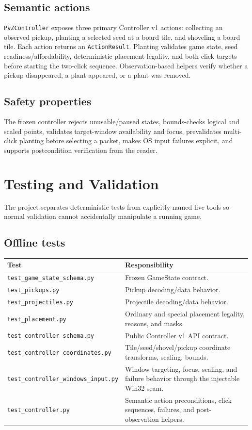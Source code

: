 \documentclass[11pt,a4paper]{article}
\begin{document}
\subsection{Semantic actions}
\texttt{PvZController} exposes three primary Controller v1 actions: collecting an observed pickup, planting a selected seed at a board tile, and shoveling a board tile. Each action returns an \texttt{ActionResult}. Planting validates game state, seed readiness/affordability, deterministic placement legality, and both click targets before starting the two-click sequence. Observation-based helpers verify whether a pickup disappeared, a plant appeared, or a plant was removed.
\subsection{Safety properties}
The frozen controller rejects unusable/paused states, bounds-checks logical and scaled points, validates target-window availability and focus, prevalidates multi-click planting before selecting a packet, makes OS input failures explicit, and supports postcondition verification from the reader.
\section{Testing and Validation}
The project separates deterministic tests from explicitly named live tools so normal validation cannot accidentally manipulate a running game.
\subsection{Offline tests}
\begin{longtable}{p{}p{}}
\toprule Test & Responsibility \\
\midrule\endhead
\texttt{test\_game\_state\_schema.py} & Frozen GameState contract. \\
\texttt{test\_pickups.py} & Pickup decoding/data behavior. \\
\texttt{test\_projectiles.py} & Projectile decoding/data behavior. \\
\texttt{test\_placement.py} & Ordinary and special placement legality, reasons, and masks. \\
\texttt{test\_controller\_schema.py} & Public Controller v1 API contract. \\
\texttt{test\_controller\_coordinates.py} & Tile/seed/shovel/pickup coordinate transforms, scaling, bounds. \\
\texttt{test\_controller\_windows\_input.py} & Window targeting, focus, scaling, and failure behavior through the injectable Win32 seam. \\
\texttt{test\_controller.py} & Semantic action preconditions, click sequences, failures, and post-observation helpers. \\
\bottomrule
\end{longtable}
\end{document}
